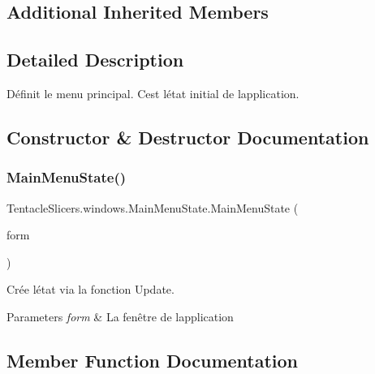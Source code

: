 \subsection*{Additional Inherited Members}


\subsection{Detailed Description}
Définit le menu principal. C\textquotesingle{}est l\textquotesingle{}état initial de l\textquotesingle{}application. 



\subsection{Constructor \& Destructor Documentation}
\mbox{\label{class_tentacle_slicers_1_1windows_1_1_main_menu_state_a168d861f7bcf27f11cd0726cda70ea5b}} 
\subsubsection{\texorpdfstring{Main\+Menu\+State()}{MainMenuState()}}
{\footnotesize\ttfamily Tentacle\+Slicers.\+windows.\+Main\+Menu\+State.\+Main\+Menu\+State (\begin{DoxyParamCaption}\item[{\hyperlink{class_tentacle_slicers_1_1windows_1_1_main_form}{Main\+Form}}]{form }\end{DoxyParamCaption})}



Crée l\textquotesingle{}état via la fonction Update. 


\begin{DoxyParams}{Parameters}
{\em form} & La fenêtre de l\textquotesingle{}application \\
\hline
\end{DoxyParams}


\subsection{Member Function Documentation}
\mbox{\label{class_tentacle_slicers_1_1windows_1_1_main_menu_state_a2f9917d79a2294298698a70cd8932226}} 
